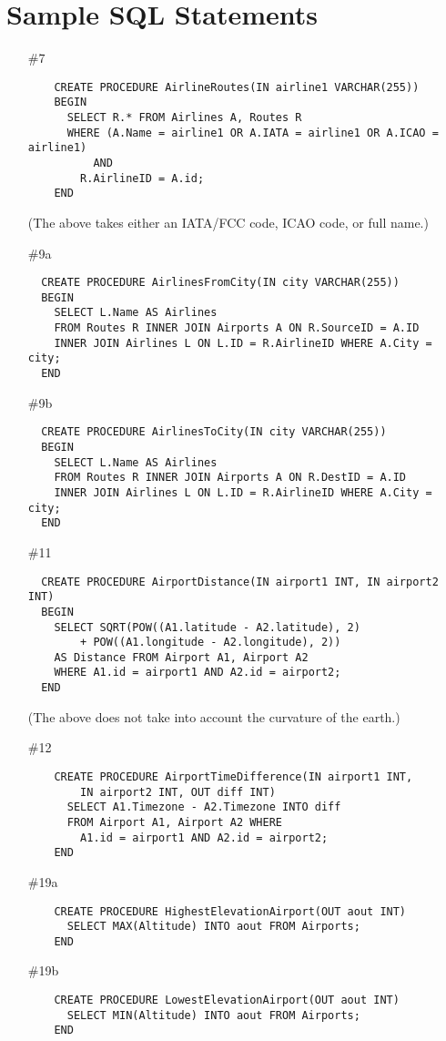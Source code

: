 \documentclass[12pt]{article}
\begin{document}
  \section{Sample SQL Statements}
  \begin{enumerate}
  \item[\#7]
  \begin{verbatim}
    CREATE PROCEDURE AirlineRoutes(IN airline1 VARCHAR(255))
    BEGIN
      SELECT R.* FROM Airlines A, Routes R
      WHERE (A.Name = airline1 OR A.IATA = airline1 OR A.ICAO = airline1) 
          AND
        R.AirlineID = A.id;
    END
  \end{verbatim}
  {\tiny (The above takes either an IATA/FCC code, ICAO code, or full name.)} 
  \item[\#9a]
  \begin{verbatim}
  CREATE PROCEDURE AirlinesFromCity(IN city VARCHAR(255))
  BEGIN
    SELECT L.Name AS Airlines
    FROM Routes R INNER JOIN Airports A ON R.SourceID = A.ID
    INNER JOIN Airlines L ON L.ID = R.AirlineID WHERE A.City = city;
  END
  \end{verbatim}
  \item[\#9b]
  \begin{verbatim}
  CREATE PROCEDURE AirlinesToCity(IN city VARCHAR(255))
  BEGIN
    SELECT L.Name AS Airlines
    FROM Routes R INNER JOIN Airports A ON R.DestID = A.ID
    INNER JOIN Airlines L ON L.ID = R.AirlineID WHERE A.City = city;
  END
  \end{verbatim}
  \item[\#11]
  \begin{verbatim}
  CREATE PROCEDURE AirportDistance(IN airport1 INT, IN airport2 INT)
  BEGIN
    SELECT SQRT(POW((A1.latitude - A2.latitude), 2)
        + POW((A1.longitude - A2.longitude), 2))
    AS Distance FROM Airport A1, Airport A2
    WHERE A1.id = airport1 AND A2.id = airport2;
  END
  \end{verbatim}
  {\tiny (The above does not take into account the curvature of the  earth.)}
  \item[\#12] 
  \begin{verbatim}
    CREATE PROCEDURE AirportTimeDifference(IN airport1 INT,
        IN airport2 INT, OUT diff INT)
      SELECT A1.Timezone - A2.Timezone INTO diff
      FROM Airport A1, Airport A2 WHERE
        A1.id = airport1 AND A2.id = airport2;
    END
  \end{verbatim}
  \item[\#19a]
  \begin{verbatim}
    CREATE PROCEDURE HighestElevationAirport(OUT aout INT)
      SELECT MAX(Altitude) INTO aout FROM Airports;
    END
  \end{verbatim}
  \item[\#19b]
  \begin{verbatim}
    CREATE PROCEDURE LowestElevationAirport(OUT aout INT)
      SELECT MIN(Altitude) INTO aout FROM Airports;
    END
  \end{verbatim}
  \end{enumerate}
\end{document}
